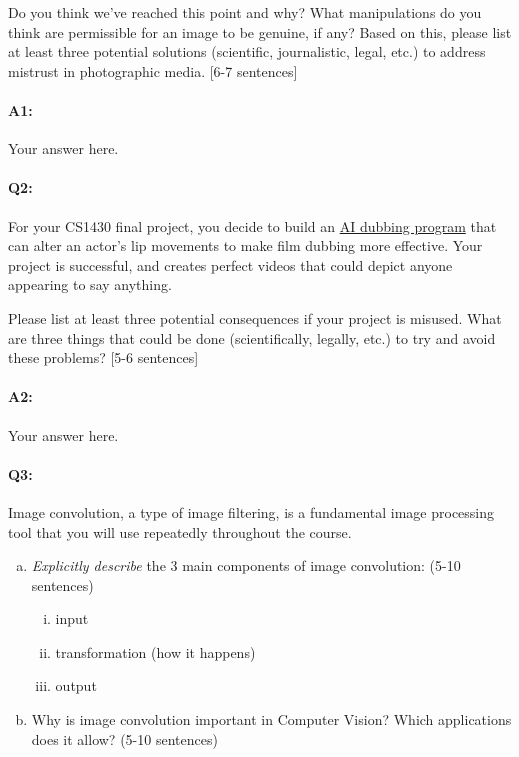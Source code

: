 Do you think we've reached this point and why? What manipulations do you think are permissible for an image to be genuine, if any? Based on this, please list at least three potential solutions (scientific, journalistic, legal, etc.) to address mistrust in photographic media. [6-7 sentences]

\paragraph{A1:} Your answer here.
\pagebreak
\paragraph{Q2:} For your CS1430 final project, you decide to build an \href{https://respeecher.medium.com/what-is-synthetic-film-dubbing-ai-deepfake-technology-explained-9f6118532e8c}{AI dubbing program} that can alter an actor's lip movements to make film dubbing more effective. Your project is successful, and creates perfect videos that could depict anyone appearing to say anything.

Please list at least three potential consequences if your project is misused. What are three things that could be done (scientifically, legally, etc.) to try and avoid these problems? [5-6 sentences]

\paragraph{A2:} Your answer here.
\pagebreak

\paragraph{Q3:} Image convolution, a type of image filtering, is a fundamental image processing tool that you will use repeatedly throughout the course.

\begin{enumerate}[(a)]
\item \emph{Explicitly describe} the 3 main components of image convolution: (5-10 sentences)
\begin{enumerate}[(i)]
    \item input
    \item transformation (how it happens)
    \item output
\end{enumerate}
\item Why is image convolution important in Computer Vision? Which applications does it allow? (5-10 sentences)
\end{enumerate}


